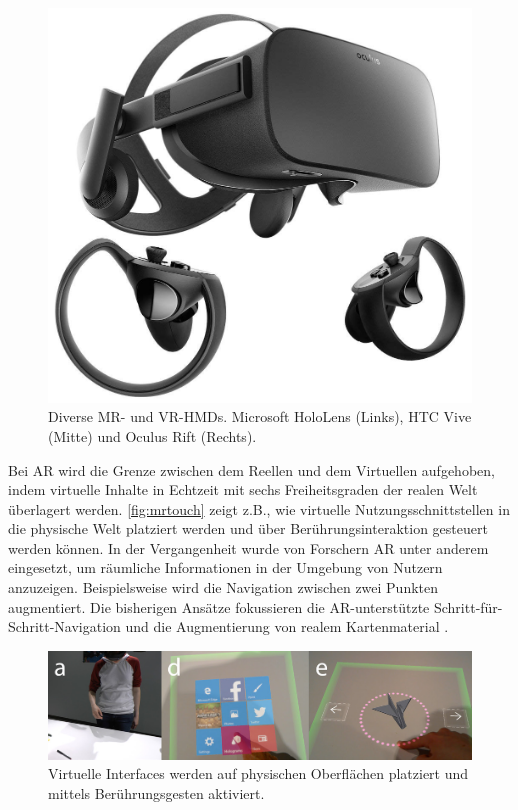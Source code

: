 \begin{figure}[hb]
\begin{minipage}{0.25\textwidth}
        \includegraphics[width=.9\linewidth]{figures/oculus_rift}
    \end{minipage}%
    \caption{Diverse MR- und VR-HMDs. Microsoft HoloLens (Links), HTC Vive (Mitte) und Oculus Rift (Rechts). }
    \label{fig:devices}
\end{figure}

Bei AR wird die Grenze zwischen dem Reellen und dem Virtuellen aufgehoben, indem virtuelle Inhalte in Echtzeit mit sechs Freiheitsgraden der realen Welt überlagert werden.
\autoref{fig:mrtouch} zeigt z.B., wie virtuelle Nutzungsschnittstellen in die physische Welt platziert werden und über Berührungsinteraktion gesteuert werden können.
In der Vergangenheit wurde von Forschern AR unter anderem eingesetzt, um räumliche Informationen in der Umgebung von Nutzern anzuzeigen.
Beispielsweise wird die Navigation zwischen zwei Punkten augmentiert.
Die bisherigen Ansätze fokussieren die AR-unterstützte Schritt-für-Schritt-Navigation \parencite{Hoellerer1999, Hashish2017, Mulloni2012} und die Augmentierung von realem Kartenmaterial \parencite{Rohs2009, Morrison2009, Reitmayr2005}.
\begin{figure}[ht]
    \centering
    \includegraphics[width=\textwidth]{figures/mrtouch}
    \caption{Virtuelle Interfaces werden auf physischen Oberflächen platziert und mittels Berührungsgesten aktiviert. }
    \label{fig:mrtouch}
\end{figure}

